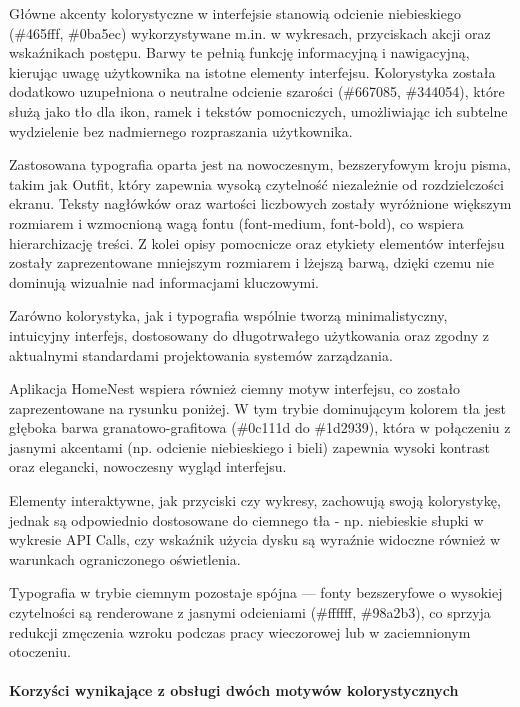 Główne akcenty kolorystyczne w interfejsie stanowią odcienie niebieskiego (\#465fff, \#0ba5ec) wykorzystywane m.in. w wykresach, przyciskach akcji oraz wskaźnikach postępu. Barwy te pełnią funkcję informacyjną i nawigacyjną, kierując uwagę użytkownika na istotne elementy interfejsu. Kolorystyka została dodatkowo uzupełniona o neutralne odcienie szarości (\#667085, \#344054), które służą jako tło dla ikon, ramek i tekstów pomocniczych, umożliwiając ich subtelne wydzielenie bez nadmiernego rozpraszania użytkownika.

Zastosowana typografia oparta jest na nowoczesnym, bezszeryfowym kroju pisma, takim jak Outfit, który zapewnia wysoką czytelność niezależnie od rozdzielczości ekranu. Teksty nagłówków oraz wartości liczbowych zostały wyróżnione większym rozmiarem i wzmocnioną wagą fontu (font-medium, font-bold), co wspiera hierarchizację treści. Z kolei opisy pomocnicze oraz etykiety elementów interfejsu zostały zaprezentowane mniejszym rozmiarem i lżejszą barwą, dzięki czemu nie dominują wizualnie nad informacjami kluczowymi.

Zarówno kolorystyka, jak i typografia wspólnie tworzą minimalistyczny, intuicyjny interfejs, dostosowany do długotrwałego użytkowania oraz zgodny z aktualnymi standardami projektowania systemów zarządzania.

Aplikacja HomeNest wspiera również ciemny motyw interfejsu, co zostało zaprezentowane na rysunku poniżej. W tym trybie dominującym kolorem tła jest głęboka barwa granatowo-grafitowa (\#0c111d do \#1d2939), która w połączeniu z jasnymi akcentami (np. odcienie niebieskiego i bieli) zapewnia wysoki kontrast oraz elegancki, nowoczesny wygląd interfejsu.

Elementy interaktywne, jak przyciski czy wykresy, zachowują swoją kolorystykę, jednak są odpowiednio dostosowane do ciemnego tła - np. niebieskie słupki w wykresie API Calls, czy wskaźnik użycia dysku są wyraźnie widoczne również w warunkach ograniczonego oświetlenia.

Typografia w trybie ciemnym pozostaje spójna — fonty bezszeryfowe o wysokiej czytelności są renderowane z jasnymi odcieniami (\#ffffff, \#98a2b3), co sprzyja redukcji zmęczenia wzroku podczas pracy wieczorowej lub w zaciemnionym otoczeniu.

\paragraph{Korzyści wynikające z obsługi dwóch motywów kolorystycznych}\mbox{}\\


